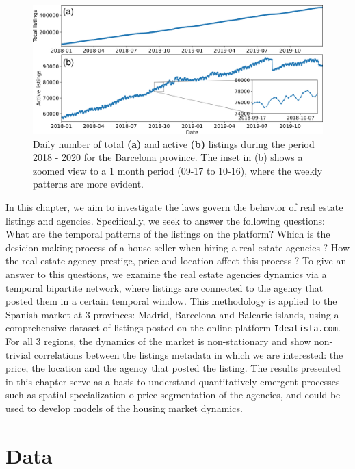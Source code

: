 \begin{figure}
    \vspace{0.2 cm}
    \centering
    \includegraphics[width =\textwidth]{Figs/Idealista_dynamics/adds_evo.pdf}
	\caption[Active listings evolution.]{\label{fig:active_adds} Daily number of total \textbf{(a)} and active \textbf{(b)} listings during the period 2018 - 2020 for the Barcelona province. The inset in (b) shows a zoomed view to a 1 month period (09-17 to 10-16), where the weekly patterns are more evident.}
\end{figure}

In this chapter, we aim to investigate the laws govern the behavior of real estate listings and agencies. Specifically, we seek to answer the following questions: What are the temporal patterns of the listings on the platform? Which is the desicion-making process of a house seller when hiring a real estate agencies ? How the real estate agency prestige, price and location affect this process ? To give an answer to this questions, we examine the real estate agencies dynamics via a temporal bipartite network, where listings are connected to the agency that posted them in a certain temporal window. This methodology is applied to the Spanish market at 3 provinces: Madrid, Barcelona and Balearic islands, using a comprehensive dataset of listings posted on the online platform \texttt{Idealista.com}. For all 3 regions, the dynamics of the market is non-stationary and show non-trivial correlations between the listings metadata in which we are interested: the price, the location and the agency that posted the listing. The results presented in this chapter serve as a basis to understand quantitatively emergent processes such as spatial specialization o price segmentation of the agencies, and could be used to develop models of the housing market dynamics.

\section{Data \label{sec:Data}}

